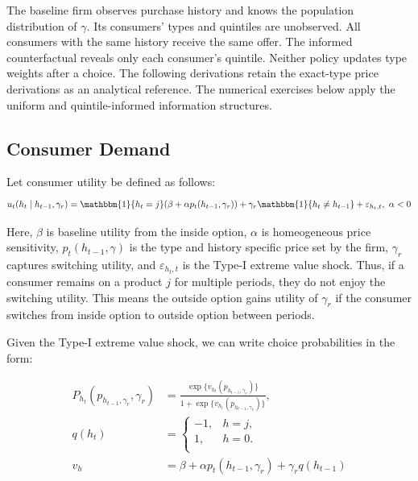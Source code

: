 \documentclass[12pt]{article}
\theoremstyle{definition}
\theoremstyle{remark}
\begin{document}
The baseline firm observes purchase history and knows the population distribution
of $\gamma$. Its consumers' types and quintiles are unobserved. All consumers
with the same history receive the same offer. The informed counterfactual reveals
only each consumer's quintile. Neither policy updates type weights after a choice.
The following derivations retain the exact-type price derivations as an analytical
reference. The numerical exercises below apply the uniform and quintile-informed
information structures.

\subsection{Consumer Demand}
\label{subsec:model-demand}

Let consumer utility be defined as follows:
\begin{equation}
  u_t(h_t\mid h_{t-1},\gamma_r) = \mathbbm{1}\{h_t=j\}(\beta+\alpha p_t(h_{t-1}, \gamma_r)) + \gamma_r\mathbbm{1}\{h_t\ne h_{t-1}\} + \varepsilon_{h_t, t}, \ \alpha < 0
\end{equation}
  
Here, $\beta$ is baseline utility from the inside option, $\alpha$ is homeogeneous price sensitivity, $p_t(h_{t-1}, \gamma)$ is the type and history specific price set by the firm, $\gamma_r$ captures switching utility, and $\varepsilon_{h_t, t}$ is the Type-I extreme value shock. Thus, if a consumer remains on a product $j$ for multiple periods, they do not enjoy the switching utility. This means the outside option gains utility of $\gamma_r$ if the consumer switches from inside option to outside option between periods. 

Given the Type-I extreme value shock, we can write choice probabilities in the form:

\begin{align}
  P_{h_t}(p_{h_{t-1}, \gamma_r}, \gamma_r) &= \frac{\exp\{v_{h_t}(p_{h_{t-1}, \gamma_r})\}}{1 + \exp\{v_{h_t}(p_{h_{t-1}, \gamma_r})\}}, \\
  q(h_t) &= 
  \begin{cases}
    -1, & h=j,\\
    1, & h=0.\\
  \end{cases}
   \\ v_h &= \beta + \alpha p_t(h_{t-1}, \gamma_r)+\gamma_rq(h_{t-1})
\end{align}
\end{document}
